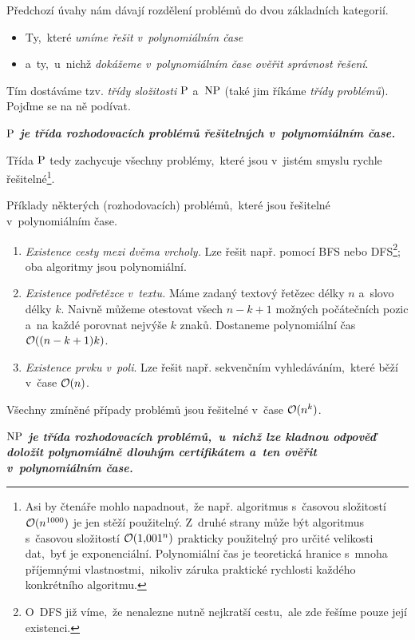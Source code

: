 Předchozí úvahy nám dávají rozdělení problémů do dvou základních kategorií.
\begin{itemize}
    \item Ty,~které \emph{umíme řešit v~polynomiálním čase}
    \item a~ty,~u~nichž \emph{dokážeme v~polynomiálním čase ověřit správnost řešení}.
\end{itemize}
Tím dostáváme tzv. \emph{třídy složitosti} \ensuremath{\classP} a~\ensuremath{\classNP} (také jim říkáme \emph{třídy problémů}). Pojďme se na ně podívat.
\begin{center}
    \textbf{\textit{\ensuremath{\classP} je třída rozhodovacích problémů řešitelných v~polynomiálním čase.}}
\end{center}
Třída \ensuremath{\classP} tedy zachycuje všechny problémy,~které jsou v~jistém smyslu rychle řešitelné\footnote{Asi by čtenáře mohlo napadnout,~že např. algoritmus s~časovou složitostí $\mathcal{O}(n^{1000})$ je jen stěží použitelný. Z~druhé strany může být algoritmus s~časovou složitostí $\mathcal{O}(1{,}001^n)$ prakticky použitelný pro určité velikosti dat,~byť je exponenciální. Polynomiální čas je teoretická hranice s~mnoha příjemnými vlastnostmi,~nikoliv záruka praktické rychlosti každého konkrétního algoritmu.}.
\begin{example}
    Příklady některých (rozhodovacích) problémů,~které jsou řešitelné v~polynomiálním čase.
    \begin{enumerate}[label=(\roman*)]
        \item \textit{Existence cesty mezi dvěma vrcholy.} Lze řešit např. pomocí BFS nebo DFS\footnote{O~DFS již víme,~že nenalezne nutně nejkratší cestu,~ale zde řešíme pouze její existenci.}; oba algoritmy jsou polynomiální.
                \item \textit{Existence podřetězce v~textu.} Máme zadaný textový řetězec délky $n$ a~slovo délky $k$. Naivně můžeme otestovat všech $n-k+1$ možných počátečních pozic a~na každé porovnat nejvýše $k$ znaků. Dostaneme polynomiální čas $\mathcal{O}((n-k+1)k)$.
        \item \textit{Existence prvku v~poli}. Lze řešit např. sekvenčním vyhledáváním,~které běží v~čase $\mathcal{O}(n)$.
    \end{enumerate}
    Všechny zmíněné případy problémů jsou řešitelné v~čase $\mathcal{O}(n^k)$.
\end{example}
\begin{center}
    \textbf{\textit{\ensuremath{\classNP} je třída rozhodovacích problémů,~u~nichž lze kladnou odpověď doložit polynomiálně dlouhým certifikátem a~ten ověřit v~polynomiálním čase.}}
\end{center}
